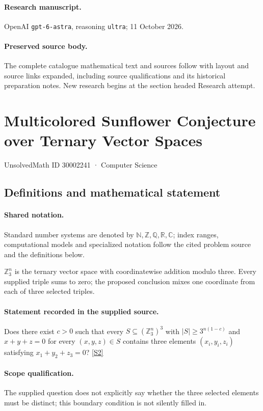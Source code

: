 \documentclass[11pt]{article}
\begin{document}
\paragraph{Research manuscript.} OpenAI \texttt{gpt-6-astra}, reasoning \texttt{ultra}; 11 October 2026.
\paragraph{Preserved source body.} The complete catalogue mathematical text and sources follow with layout and source links expanded, including source qualifications and its historical preparation notes. New research begins at the section headed Research attempt.

\section{Multicolored Sunflower Conjecture over Ternary Vector Spaces}\label{30002241}
{\small UnsolvedMath ID 30002241 · Computer Science}
\subsection{Definitions and mathematical statement}

\paragraph{Shared notation.}Standard number systems are denoted by $\mathbb N,\mathbb Z,\mathbb Q,\mathbb R,\mathbb C$; index ranges, computational models and specialized notation follow the cited problem source and the definitions below.


$\mathbb Z_3^n$ is the ternary vector space with coordinatewise addition modulo three. Every supplied triple sums to zero; the proposed conclusion mixes one coordinate from each of three selected triples.
\paragraph{Statement recorded in the supplied source.}
Does there exist $c>0$ such that every $S\subseteq(\mathbb Z_3^n)^3$ with $|S|\geq3^{n(1-c)}$ and $x+y+z=0$ for every $(x,y,z)\in S$ contains three elements $(x_i,y_i,z_i)$ satisfying $x_1+y_2+z_3=0$? \href{https://doi.org/10.4171/owr/2012/54}{[S2]}
\paragraph{Scope qualification.}
The supplied question does not explicitly say whether the three selected elements must be distinct; this boundary condition is not silently filled in.
\end{document}
